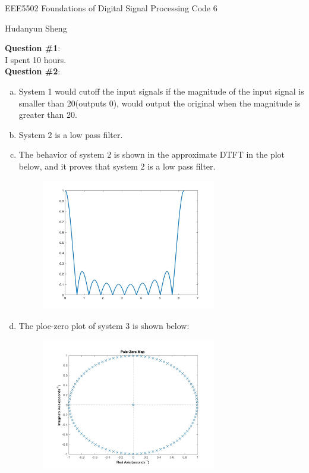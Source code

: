 \documentclass[a4paper]{article}
\begin{document}
\begin{spacing}{2.0}
\begin{flushleft}\begin{huge}EEE5502 Foundations of Digital Signal Processing   Code 6\end{huge}\end{flushleft}
\begin{flushright}\begin{Large} Hudanyun Sheng \end{Large}\end{flushright}

\Large\textbf{ Question \#1}:  \\
\normalsize
I spent 10 hours.\\

\Large\textbf{Question \#2}:  
\normalsize
\begin{enumerate}[(a)]
\item System 1 would cutoff the input signals if the magnitude of the input signal is smaller than 20(outputs 0), would output the original when the magnitude is greater than 20. 

\item System 2 is a low pass filter.

\item The behavior of system 2 is shown in the approximate DTFT in the plot below, and it proves that system 2 is a low pass filter.
\begin{figure} [H]
\centering
\includegraphics[width=3in]{2c.jpg}
\label{fig:graph}
\end{figure}

\item The ploe-zero plot of system 3 is shown below:
\begin{figure} [H]
\centering
\includegraphics[width=3in]{2d.jpg}
\label{fig:graph}
\end{figure}


\end{enumerate}
\end{spacing}
\end{document}
